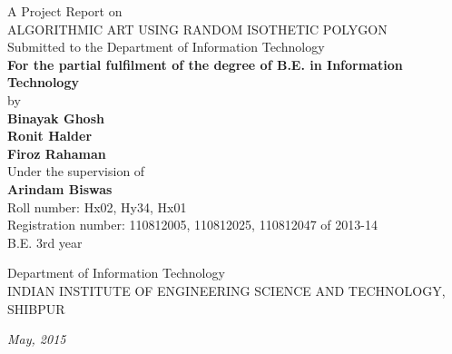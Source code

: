 \documentclass[12pt]{article}
\begin{document}
\begin{titlepage}
\thispagestyle{empty}
{\centering
{\large A Project Report on}\\
\vspace{0.5cm}
\large
{\Huge ALGORITHMIC ART USING RANDOM ISOTHETIC POLYGON}\\
\vspace{0.5cm}
Submitted to the Department of Information Technology\\
\vspace{1cm}
{\Large\bf For the partial fulfilment of the degree of B.E. in Information Technology}\\
\vspace{1cm}
by \\
\vspace{.5cm}
\hspace{.05cm} {\large \bf{Binayak Ghosh}}\\
\hspace{.05cm} {\large \bf{Ronit Halder}}\\
\hspace{.05cm} {\large \bf{Firoz Rahaman}}\\
\vspace {0.3cm}
\hspace{.05cm} Under the supervision of\\
\hspace{.05cm} {\large \bf{Arindam Biswas}}\\
\vspace {0.8cm}
Roll number: Hx02, Hy34, Hx01\\
Registration number: 110812005, 110812025, 110812047 of 2013-14\\
B.E. 3rd year\\
\vspace*{0.7cm}
\begin{figure}[h]
{\par}
\end{figure}
Department of Information Technology\\
INDIAN INSTITUTE OF ENGINEERING SCIENCE AND TECHNOLOGY, SHIBPUR\\
\begin{center}
\textit{May, 2015}
\end{center}

{\centering
\hspace{6.5cm} \date{\today}}
}
\pagebreak
\end{titlepage}
\end{document}
